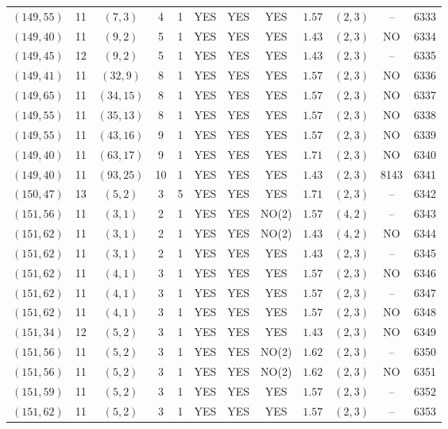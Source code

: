 \begin{longtable}{|c|c|c|c|c|c|c|c|c|c|c|c|}
$(149,55)$ & 11 & $(7,3)$ & 4 & 1 & YES & YES & YES & $1.57$ & $(2,3)$ & -- & 6333\\
$(149,40)$ & 11 & $(9,2)$ & 5 & 1 & YES & YES & YES & $1.43$ & $(2,3)$ & NO & 6334\\
$(149,45)$ & 12 & $(9,2)$ & 5 & 1 & YES & YES & YES & $1.43$ & $(2,3)$ & -- & 6335\\
$(149,41)$ & 11 & $(32,9)$ & 8 & 1 & YES & YES & YES & $1.57$ & $(2,3)$ & NO & 6336\\
$(149,65)$ & 11 & $(34,15)$ & 8 & 1 & YES & YES & YES & $1.57$ & $(2,3)$ & NO & 6337\\
$(149,55)$ & 11 & $(35,13)$ & 8 & 1 & YES & YES & YES & $1.57$ & $(2,3)$ & NO & 6338\\
$(149,55)$ & 11 & $(43,16)$ & 9 & 1 & YES & YES & YES & $1.57$ & $(2,3)$ & NO & 6339\\
$(149,40)$ & 11 & $(63,17)$ & 9 & 1 & YES & YES & YES & $1.71$ & $(2,3)$ & NO & 6340\\
$(149,40)$ & 11 & $(93,25)$ & 10 & 1 & YES & YES & YES & $1.43$ & $(2,3)$ & 8143 & 6341\\
$(150,47)$ & 13 & $(5,2)$ & 3 & 5 & YES & YES & YES & $1.71$ & $(2,3)$ & -- & 6342\\
$(151,56)$ & 11 & $(3,1)$ & 2 & 1 & YES & YES & NO(2) & $1.57$ & $(4,2)$ & -- & 6343\\
$(151,62)$ & 11 & $(3,1)$ & 2 & 1 & YES & YES & NO(2) & $1.43$ & $(4,2)$ & NO & 6344\\
$(151,62)$ & 11 & $(3,1)$ & 2 & 1 & YES & YES & YES & $1.43$ & $(2,3)$ & -- & 6345\\
$(151,62)$ & 11 & $(4,1)$ & 3 & 1 & YES & YES & YES & $1.57$ & $(2,3)$ & NO & 6346\\
$(151,62)$ & 11 & $(4,1)$ & 3 & 1 & YES & YES & YES & $1.57$ & $(2,3)$ & -- & 6347\\
$(151,62)$ & 11 & $(4,1)$ & 3 & 1 & YES & YES & YES & $1.57$ & $(2,3)$ & NO & 6348\\
$(151,34)$ & 12 & $(5,2)$ & 3 & 1 & YES & YES & YES & $1.43$ & $(2,3)$ & NO & 6349\\
$(151,56)$ & 11 & $(5,2)$ & 3 & 1 & YES & YES & NO(2) & $1.62$ & $(2,3)$ & -- & 6350\\
$(151,56)$ & 11 & $(5,2)$ & 3 & 1 & YES & YES & NO(2) & $1.62$ & $(2,3)$ & NO & 6351\\
$(151,59)$ & 11 & $(5,2)$ & 3 & 1 & YES & YES & YES & $1.57$ & $(2,3)$ & -- & 6352\\
$(151,62)$ & 11 & $(5,2)$ & 3 & 1 & YES & YES & YES & $1.57$ & $(2,3)$ & -- & 6353\\

\end{longtable}

